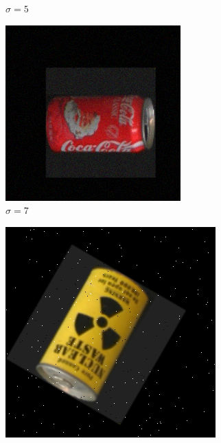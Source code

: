 \begin{figure}[tbp]
\begin{subfigure}{0.329\textwidth}
	\caption{$\sigma = 5$}
    \end{subfigure}
    \begin{subfigure}{0.329\textwidth}
        \centering
    \includegraphics[width=\textwidth]{figures/noise/gauss7.png}
	\caption{$\sigma = 7$}
    \end{subfigure}
    \begin{subfigure}{0.329\textwidth}
        \centering
    \includegraphics[width=\textwidth]{figures/noise/pepper04.png}

\end{subfigure}
\end{figure}
